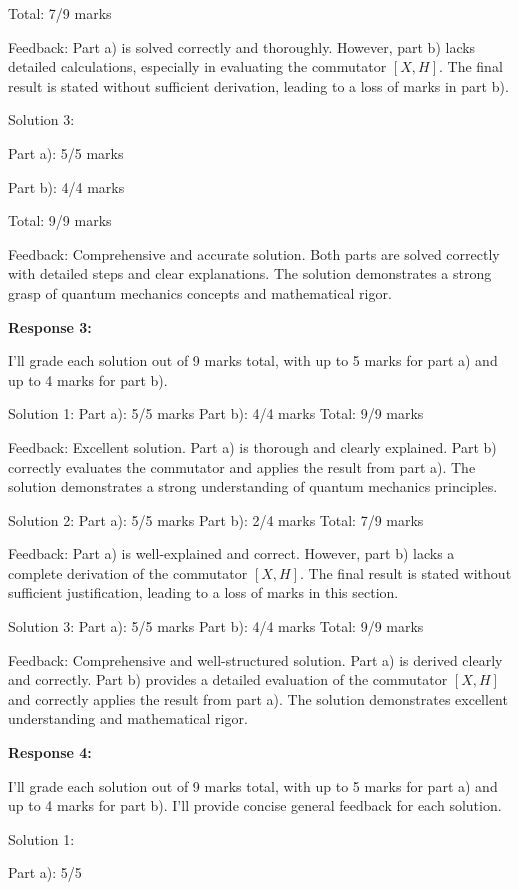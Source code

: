 \documentclass[a4paper,11pt]{article}
\begin{document}
Total: 7/9 marks

Feedback: Part a) is solved correctly and thoroughly. However, part b) lacks detailed calculations, especially in evaluating the commutator \([X, H]\). The final result is stated without sufficient derivation, leading to a loss of marks in part b).

Solution 3:

Part a): 5/5 marks

Part b): 4/4 marks

Total: 9/9 marks

Feedback: Comprehensive and accurate solution. Both parts are solved correctly with detailed steps and clear explanations. The solution demonstrates a strong grasp of quantum mechanics concepts and mathematical rigor.

\bigskip
\textbf{Response 3:}

I'll grade each solution out of 9 marks total, with up to 5 marks for part a) and up to 4 marks for part b).

Solution 1:
Part a): 5/5 marks
Part b): 4/4 marks
Total: 9/9 marks

Feedback: Excellent solution. Part a) is thorough and clearly explained. Part b) correctly evaluates the commutator and applies the result from part a). The solution demonstrates a strong understanding of quantum mechanics principles.

Solution 2:
Part a): 5/5 marks
Part b): 2/4 marks
Total: 7/9 marks

Feedback: Part a) is well-explained and correct. However, part b) lacks a complete derivation of the commutator \([X,H]\). The final result is stated without sufficient justification, leading to a loss of marks in this section.

Solution 3:
Part a): 5/5 marks
Part b): 4/4 marks
Total: 9/9 marks

Feedback: Comprehensive and well-structured solution. Part a) is derived clearly and correctly. Part b) provides a detailed evaluation of the commutator \([X,H]\) and correctly applies the result from part a). The solution demonstrates excellent understanding and mathematical rigor.

\bigskip   
\textbf{Response 4:}

I'll grade each solution out of 9 marks total, with up to 5 marks for part a) and up to 4 marks for part b). I'll provide concise general feedback for each solution.

Solution 1:

Part a): 5/5
\end{document}
